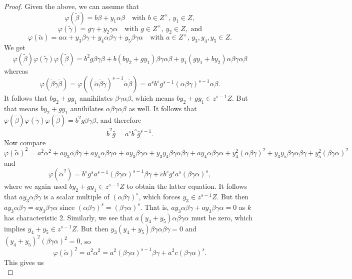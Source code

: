 \documentclass{amsart}
\theoremstyle{plain}\newtheorem{Theorem}{Theorem}[section]
\theoremstyle{plain}\newtheorem{Conjecture}[Theorem]{Conjecture}
\theoremstyle{plain}\newtheorem{Corollary}[Theorem]{Corollary}
\theoremstyle{plain}\newtheorem{Lemma}[Theorem]{Lemma}
\theoremstyle{plain}\newtheorem{Proposition}[Theorem]{Proposition}
\theoremstyle{definition}\newtheorem{Definition}[Theorem]{Definition}
\theoremstyle{definition}\newtheorem{Example}[Theorem]{Example}
\theoremstyle{definition}\newtheorem{Examples}[Theorem]{Examples}
\theoremstyle{definition}\newtheorem{Exercise}[Theorem]{Exercise}
\theoremstyle{definition}\newtheorem{Notation}[Theorem]{Notation}
\theoremstyle{definition}\newtheorem{Remark}[Theorem]{Remark}
\theoremstyle{definition}\newtheorem{Remarks}[Theorem]{Remarks}
\numberwithin{equation}{section}
\begin{document}
\begin{proof}
  Given the above, we can assume that
  $$
    \varphi(\tilde \beta)=b\beta + y_1 \alpha\beta \quad\textrm{with $b\in Z^\times$, $y_1\in Z$},
  $$
  $$
    \varphi(\tilde \gamma)=g\gamma + y_2 \gamma\alpha \quad\textrm{with $g\in Z^\times$, $y_2\in Z$},\textrm{ and}
  $$
  $$
    \varphi(\tilde \alpha)=a\alpha + y_3 \beta\gamma+y_4 \alpha\beta\gamma + y_5 \beta\gamma\alpha \quad\textrm{with $a\in Z^\times$, $y_3,y_4,y_5\in Z$}.
  $$
  We get 
  $$
    \varphi(\tilde\beta)\varphi(\tilde\gamma)\varphi(\tilde\beta) = b^2g \beta\gamma\beta + b(by_2+gy_1)\beta\gamma\alpha\beta+y_1(gy_1+by_2)\alpha\beta\gamma\alpha\beta
  $$
  whereas 
  $$
    \varphi(\tilde\beta\tilde\gamma\tilde\beta)= \varphi((\tilde \alpha\tilde\beta\tilde\gamma)^{s-1}\tilde\alpha\tilde\beta)= a^sb^sg^{s-1} (\alpha\beta\gamma)^{s-1}\alpha\beta.
  $$
  It follows that $by_2+gy_1$ annihilates $\beta\gamma\alpha\beta$, which means $by_2+gy_1\in z^{s-1}Z$. But that means $by_2+gy_1$ annihilates $\alpha\beta\gamma\alpha\beta$ as well. It follows that $\varphi(\tilde\beta)\varphi(\tilde\gamma)\varphi(\tilde\beta) = b^2g \beta\gamma\beta$, and therefore 
  \begin{equation} \label{eqn:rels for hom 1}
    \bar b^2 \bar g= \bar a^s \bar b^s \bar g^{s-1}.
  \end{equation} 
  Now compare
  $$
    \varphi(\tilde\alpha)^2 = a^2\alpha^2 + ay_3 \alpha\beta\gamma + ay_5\alpha\beta\gamma\alpha +ay_3\beta\gamma\alpha + y_3y_4 \beta\gamma\alpha\beta\gamma + ay_4 \alpha\beta\gamma\alpha + y_4^2 (\alpha\beta\gamma)^2 + y_3y_5 \beta\gamma\alpha\beta\gamma + y_5^2 (\beta\gamma\alpha)^2 $$
  and 
  $$ \varphi(\tilde \alpha^2)= b^sg^sa^{s-1}(\beta\gamma\alpha)^{s-1}\beta\gamma+\tilde c b^sg^sa^s(\beta\gamma\alpha)^{s},$$
  where we again used $by_2+gy_1\in z^{s-1}Z$ to obtain the latter equation. It follows that $ay_3 \alpha\beta\gamma$ is a scalar multiple of $(\alpha\beta\gamma)^s$, which forces $y_3\in z^{s-1}Z$. But then $ay_3 \alpha\beta\gamma = ay_3\beta\gamma\alpha$ since $(\alpha\beta\gamma)^s=(\beta\gamma\alpha)^s$. That is, $ay_3 \alpha\beta\gamma + ay_3\beta\gamma\alpha =0$ as $k$ has characteristic $2$. Similarly, we see that $a(y_4+y_5)\alpha\beta\gamma\alpha$ must be zero, which implies $y_4+y_5\in z^{s-1}Z$. But then $y_3(y_4+y_5)\beta\gamma\alpha\beta\gamma=0$ and $(y_4+y_5)^2(\beta\gamma\alpha)^2=0$, so 
  $$\varphi(\tilde\alpha)^2 = a^2\alpha^2 = a^2(\beta\gamma\alpha)^{s-1}\beta\gamma+a^2c(\beta\gamma\alpha)^{s}.$$ 
  This gives us 
  \begin{equation} \label{eqn:rels for hom 2}

\end{equation}
\end{proof}
\end{document}
